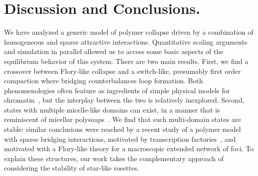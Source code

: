 \documentclass[
preprint,
a4paper,
12pt,
superscriptaddress,
pre]{revtex4}
\begin{document}


\section{Discussion and Conclusions. }
\label{sec:Disc}


We have analyzed a generic model of polymer collapse driven by a
combination of homogeneous and sparse attractive interactions.
Quantitative scaling arguments and simulation in parallel allowed us
to access some basic aspects of the equilibrium behavior of this
system.
%
%
There are two main results. 
First, we find a crossover between Flory-like collapse and a
switch-like, presumably first order compaction where bridging
counterbalances loop formation. Both phenomenologies often feature as
ingredients of simple physical models for
chromatin~\cite{Marenduzzo2006c,Brackley2013,Barbieri2013b,Mirny2011,Buenemann2010},
but the interplay between the two is relatively inexplored.
Second, states with multiple micelle-like domains can exist, in a
manner that is reminiscent of micellar
polysoaps~\cite{Borisov1996}. We find that such multi-domain states
are stable: similar conclusions were reached by a recent study of a
polymer model with sparse bridging interactions, motivated by
transcription factories~\cite{Junier2010}, and motivated with a
Flory-like theory for a macroscopic extended network of foci. To
explain these structures, our work takes the complementary approach of
considering the stability of star-like rosettes.
%
\end{document}
